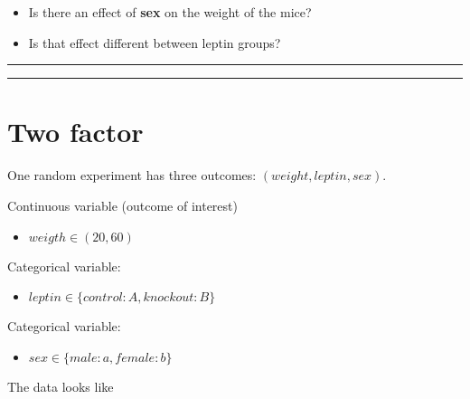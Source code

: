 \documentclass[
]{book}
\providecommand{\tightlist}{%
  \setlength{\itemsep}{0pt}\setlength{\parskip}{0pt}}
\begin{document}
\begin{itemize}
\item
  Is there an effect of \textbf{sex} on the weight of the mice?
\item
  Is that effect different between leptin groups?
\end{itemize}

\begin{center}\rule{0.5\linewidth}{0.5pt}\end{center}

\begin{center}\rule{0.5\linewidth}{0.5pt}\end{center}

\hypertarget{two-factor}{%
\section{Two factor}\label{two-factor}}

One random experiment has three outcomes: \((weight, leptin, sex)\).

Continuous variable (outcome of interest)

\begin{itemize}
\tightlist
\item
  \(weigth \in (20, 60)\)
\end{itemize}

Categorical variable:

\begin{itemize}
\tightlist
\item
  \(leptin \in \{control:A,knockout:B\}\)
\end{itemize}

Categorical variable:

\begin{itemize}
\tightlist
\item
  \(sex \in \{male:a,female:b\}\)
\end{itemize}

The data looks like
\end{document}
